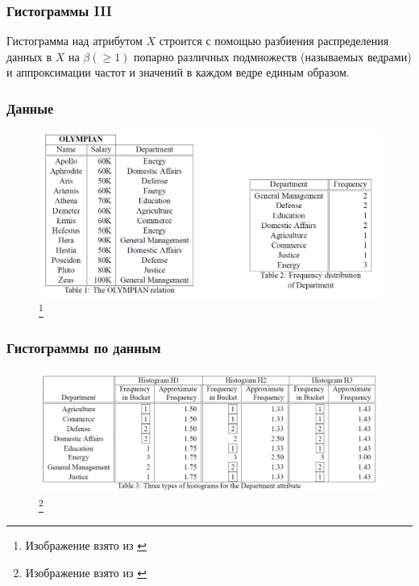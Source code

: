 \documentclass{beamer}
\begin{document}
\begin{frame}
\frametitle{Гистограммы III}

Гистограмма над атрибутом $X$ строится с помощью разбиения распределения данных в $X$ на $\beta (\ge 1)$ попарно различных подмножеств (называемых ведрами) и аппроксимации частот и значений в каждом ведре единым образом.
\end{frame}

\begin{frame}
\frametitle{Данные}

\begin{figure}[htb]
\includegraphics[width=\textwidth,height=0.79\textheight,keepaspectratio]{histogram-example-ioannidis.png} 
\footnote{\tiny{Изображение взято из \cite{Ioannidis1995}}}
\end{figure}

\end{frame}


\begin{frame}
\frametitle{Гистограммы по данным}

\begin{figure}[htb]
\includegraphics[width=\textwidth,height=0.79\textheight,keepaspectratio]{histogram-example-ioannidis-2.png} 
\footnote{\tiny{Изображение взято из \cite{Ioannidis1995}}}
\end{figure}

\end{frame}
\end{document}
